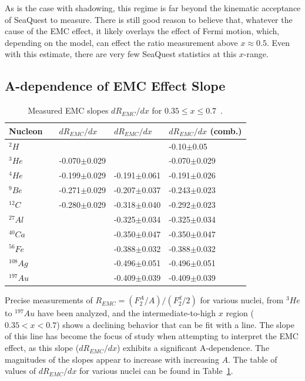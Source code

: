 As is the case with shadowing, this regime is far beyond the kinematic acceptance of SeaQuest to measure. There is still good reason to believe that, whatever the cause of the EMC effect, it likely overlays the effect of Fermi motion, which, depending on the model, can effect the ratio measurement above $x\approx0.5$. Even with this estimate, there are very few SeaQuest statistics at this $x$-range.

\subsection{A-dependence of EMC Effect Slope}

\begin{table}
	\centering
	\setlength{\tabcolsep}{2em}
	\begin{tabular}{@{}lllll@{}}\toprule
		Nucleon & & $dR_{EMC}/dx$~\cite{Seely:2009gt} & $dR_{EMC}/dx$~\cite{Gomez:1993ri} & $dR_{EMC}/dx$ (comb.) \\ \midrule	
		$^2H$ & & 									 & 								  & -0.10$\pm$0.05~\cite{Griffioen:2015hxa} \\
		$^3He$ & & -0.070$\pm$0.029 	& 								& -0.070$\pm$0.029 \\
		$^4He$ & & -0.199$\pm$0.029		& -0.191$\pm$0.061   & -0.191$\pm$0.026 \\
		$^9Be$ & & -0.271$\pm$0.029		 & -0.207$\pm$0.037  & -0.243$\pm$0.023 \\
		$^{12}C$ & & -0.280$\pm$0.029	& -0.318$\pm$0.040  & -0.292$\pm$0.023 \\
		$^{27}Al$ & & 								& -0.325$\pm$0.034  & -0.325$\pm$0.034 \\
		$^{40}Ca$ & & 								& -0.350$\pm$0.047 & -0.350$\pm$0.047 \\
		$^{56}Fe$ & & 								& -0.388$\pm$0.032 & -0.388$\pm$0.032 \\
		$^{108}Ag$ & & 								& -0.496$\pm$0.051 & -0.496$\pm$0.051 \\
		$^{197}Au$ & & 								& -0.409$\pm$0.039 & -0.409$\pm$0.039 \\ \bottomrule		
	\end{tabular}
	\caption{Measured EMC slopes $dR_{EMC}/dx$ for $0.35\leq x \leq 0.7$~\cite{Piasetzky:2011zz}.}
	\label{tab:emc-slopes}
\end{table}

Precise measurements of $R_{EMC}=(F_2^A/A)/(F_2^d/2)$ for various nuclei, from $^3He$ to $^{197}Au$ have been analyzed, and the intermediate-to-high $x$ region ($0.35<x<0.7$) shows a declining behavior that can be fit with a line. The slope of this line has become the focus of study when attempting to interpret the EMC effect, as this slope ($dR_{EMC}/dx$) exhibits a significant A-dependence. The magnitudes of the slopes appear to increase with increasing $A$. The table of values of $dR_{EMC}/dx$ for various nuclei can be found in Table~\ref{tab:emc-slopes}.

